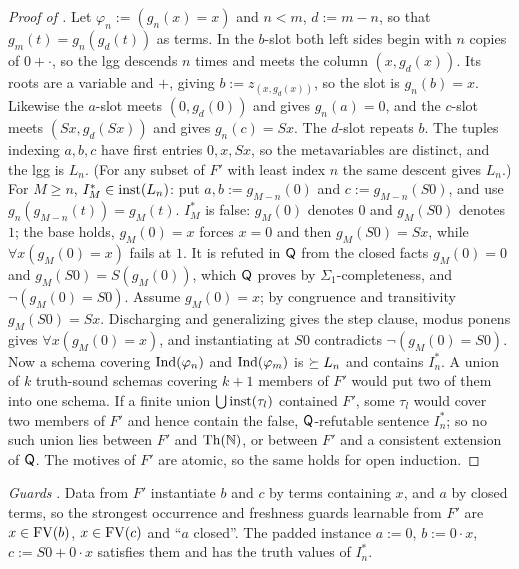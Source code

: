 \begin{proof}[Proof of ]
Let $\varphi_n:=(g_n(x)=x)$ and $n<m$, $d:=m-n$, so that $g_m(t)=g_n(g_d(t))$ as terms. In the $b$-slot both left sides
begin with $n$ copies of $0+\cdot$, so the lgg descends $n$ times and meets the column $(x,g_d(x))$. Its roots are a
variable and $+$, giving $b:=z_{(x,g_d(x))}$, so the slot is $g_n(b)=x$. Likewise the $a$-slot meets $(0,g_d(0))$ and
gives $g_n(a)=0$, and the $c$-slot meets $(Sx,g_d(Sx))$ and gives $g_n(c)=Sx$. The $d$-slot repeats $b$. The tuples
indexing $a,b,c$ have first entries $0,x,Sx$, so the metavariables are distinct, and the lgg is $L_n$. (For any subset
of $F'$ with least index $n$ the same descent gives $L_n$.)
For $M\ge n$, $I^*_M\in\mathrm{inst}(L_n)$: put $a,b:=g_{M-n}(0)$ and $c:=g_{M-n}(S0)$, and use $g_n(g_{M-n}(t))=g_M(t)$.
$I^*_M$ is false: $g_M(0)$ denotes $0$ and $g_M(S0)$ denotes $1$; the base holds, $g_M(0)=x$ forces $x=0$ and then
$g_M(S0)=Sx$, while $\forall x(g_M(0)=x)$ fails at $1$. It is refuted in $\mathsf{Q}$ from the closed facts $g_M(0)=0$ and
$g_M(S0)=S(g_M(0))$, which $\mathsf{Q}$ proves by $\Sigma_1$-completeness, and $\neg(g_M(0)=S0)$. Assume $g_M(0)=x$; by
congruence and transitivity $g_M(S0)=Sx$. Discharging and generalizing gives the step clause, modus ponens gives
$\forall x(g_M(0)=x)$, and instantiating at $S0$ contradicts $\neg(g_M(0)=S0)$.
Now a schema covering $\mathrm{Ind}(\varphi_n)$ and $\mathrm{Ind}(\varphi_m)$ is $\succeq L_n$ and contains $I^*_n$. A union of $k$
truth-sound schemas covering $k+1$ members of $F'$ would put two of them into one schema. If a finite union $\bigcup\mathrm{inst}(\tau_l)$
contained $F'$, some $\tau_l$ would cover two members of $F'$ and hence contain the false, $\mathsf{Q}$-refutable sentence
$I^*_n$; so no such union lies between $F'$ and $\mathrm{Th}(\mathbb{N})$, or between $F'$ and a consistent extension of $\mathsf{Q}$. The
motives of $F'$ are atomic, so the same holds for open induction.
\end{proof}
\emph{Guards} . Data from $F'$ instantiate $b$ and $c$ by terms containing $x$, and $a$
by closed terms, so the strongest occurrence and freshness guards learnable from $F'$ are $x\in\mathrm{FV}(b)$, $x\in\mathrm{FV}(c)$ and
``$a$ closed''. The padded instance $a:=0$, $b:=0\cdot x$, $c:=S0+0\cdot x$ satisfies them and has the truth values of
$I^*_n$.


